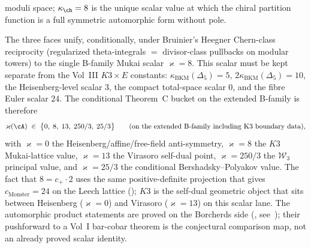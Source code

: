 \begin{remark}
\begin{enumerate}[label=\textup{(\roman*)}]
 moduli space; $\kappa_\ch = 8$ is the unique scalar value at
 which the chiral partition function is a full symmetric
 automorphic form without pole.
\end{enumerate}
The three faces unify, conditionally, under Bruinier's Heegner Chern-class
reciprocity \textup{(}regularized theta-integrals $=$ divisor-class
pullbacks on modular towers\textup{)} to the single B-family Mukai
scalar $\varkappa = 8$. This scalar must be kept separate from the
Vol~III $K3\times E$ constants:
$\kappa_{\mathrm{BKM}}(\Delta_5)=5$,
$2\kappa_{\mathrm{BKM}}(\Delta_5)=10$, the Heisenberg-level scalar
$3$, the compact total-space scalar $0$, and the fibre Euler scalar
$24$. The conditional Theorem~C bucket on the extended B-family is
therefore
\begin{equation}\label{eq:frontier-K3-bucket}
\varkappa(\cA)
\;\in\;
\bigl\{0,\;8,\;13,\;250/3,\;25/3\bigr\}
\qquad
\textup{(}\text{on the extended B-family including K3 boundary data}\textup{)},
\end{equation}
with $\varkappa = 0$ the Heisenberg/affine/free-field anti-symmetry,
$\varkappa = 8$ the $K3$ Mukai-lattice value,
$\varkappa = 13$ the Virasoro self-dual point,
$\varkappa = 250/3$ the $\mathcal{W}_3$ principal value, and
$\varkappa = 25/3$ the conditional Bershadsky--Polyakov value. The fact that
$8 = c_+\cdot 2$ uses the same positive-definite projection that
gives $c_{\mathrm{Monster}} = 24$ on the Leech lattice
\textup{(\cite{Borcherds92})}; $K3$ is the self-dual geometric object
that sits between Heisenberg ($\varkappa = 0$) and Virasoro
($\varkappa = 13$) on this scalar lane. The automorphic product
statements are proved on the Borcherds side
\textup{(}\cite{Borcherds1995}, see~\cite[Ch.~4]{Borcherds92}\textup{)};
their pushforward to a Vol~I bar-cobar theorem is the conjectural
comparison map, not an already proved scalar identity.
\end{remark}

